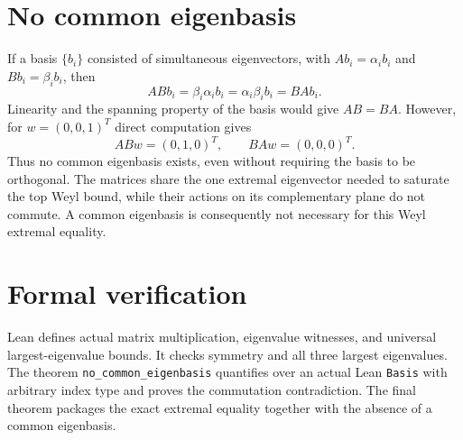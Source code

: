\documentclass[10pt,a4paper]{article}
\begin{document}
\section*{No common eigenbasis}
If a basis $\{b_i\}$ consisted of simultaneous eigenvectors, with
$Ab_i=\alpha_i b_i$ and $Bb_i=\beta_i b_i$, then
\[
ABb_i=\beta_i\alpha_i b_i=\alpha_i\beta_i b_i=BAb_i.
\]
Linearity and the spanning property of the basis would give $AB=BA$.
However, for $w=(0,0,1)^T$ direct computation gives
\[
ABw=(0,1,0)^T,\qquad BAw=(0,0,0)^T.
\]
Thus no common eigenbasis exists, even without requiring the basis to
be orthogonal. The matrices share the one extremal eigenvector needed
to saturate the top Weyl bound, while their actions on its complementary
plane do not commute. A common eigenbasis is consequently not necessary
for this Weyl extremal equality.

\section*{Formal verification}
Lean defines actual matrix multiplication, eigenvalue witnesses, and
universal largest-eigenvalue bounds. It checks symmetry and all three
largest eigenvalues. The theorem \texttt{no\_common\_eigenbasis} quantifies
over an actual Lean \texttt{Basis} with arbitrary index type and proves
the commutation contradiction. The final theorem packages the exact
extremal equality together with the absence of a common eigenbasis.
\end{document}
